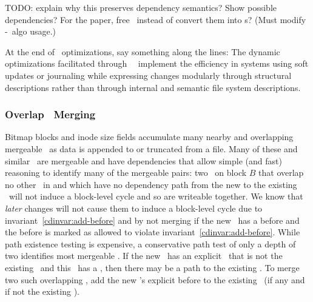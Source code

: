 TODO: explain why this preserves dependency semantics? Show possible
dependencies? For the paper, free \chdescs\ instead of convert them
into \noop{}s? (Must modify \nrb-\nrb\ algo usage.)


At the end of \chdesc\ optimizations, say something along the lines:
%
The dynamic optimizations facilitated through \nrb\
\chdescs\ implement the efficiency in systems using soft updates or
journaling\todo{Actually do this for journaling} while expressing
changes modularly through structural descriptions rather than through
internal and semantic file system descriptions.


\subsubsection{Overlap \ChDesc\ Merging}
\label{sec:chdescs:merge:overlap}
Bitmap blocks and inode size fields accumulate many nearby and
overlapping mergeable \chdescs\ as data is appended to or truncated
from a file.
%
Many of these and similar \chdescs\ are mergeable and have
dependencies that allow simple (and fast) reasoning to identify many
of the mergeable pairs: two \chdescs\ on block $B$ that overlap no other \chdescs\ in 
and which have no dependency path from the new to the existing \chdesc\
will not induce a block-level cycle and so are writeable together.
We know that \textit{later} changes will not cause them to induce a block-level cycle due to
invariant~\ref{cdinvar:add-before} and by not merging if the new \chdesc\
has a before and the before is marked as allowed to violate
invariant~\ref{cdinvar:add-before}.
%
While path existence testing is expensive, a conservative path test
of only a depth of two identifies most mergeable \chdescs. If the new
\chdesc\ has an explicit \before\ that is not the existing \chdesc\ and
this \before\ has a \before, then there may be a path to the existing
\chdesc.
%
To merge two such overlapping \chdescs, add the new \chdesc's explicit
before to the existing \chdesc\ (if any and if not the existing \chdesc).
